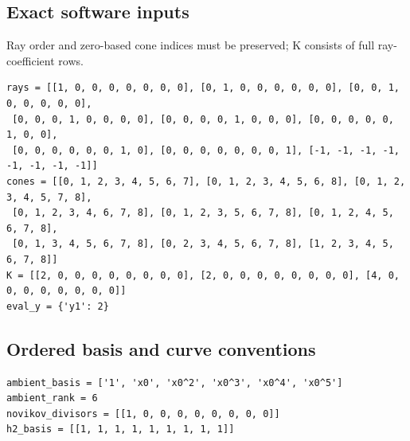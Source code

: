 \documentclass[10pt,a4paper]{article}
\begin{document}
\subsection*{Exact software inputs}
Ray order and zero-based cone indices must be preserved; K consists of full ray-coefficient rows.
\begin{lstlisting}
rays = [[1, 0, 0, 0, 0, 0, 0, 0], [0, 1, 0, 0, 0, 0, 0, 0], [0, 0, 1, 0, 0, 0, 0, 0],
 [0, 0, 0, 1, 0, 0, 0, 0], [0, 0, 0, 0, 1, 0, 0, 0], [0, 0, 0, 0, 0, 1, 0, 0],
 [0, 0, 0, 0, 0, 0, 1, 0], [0, 0, 0, 0, 0, 0, 0, 1], [-1, -1, -1, -1, -1, -1, -1, -1]]
cones = [[0, 1, 2, 3, 4, 5, 6, 7], [0, 1, 2, 3, 4, 5, 6, 8], [0, 1, 2, 3, 4, 5, 7, 8],
 [0, 1, 2, 3, 4, 6, 7, 8], [0, 1, 2, 3, 5, 6, 7, 8], [0, 1, 2, 4, 5, 6, 7, 8],
 [0, 1, 3, 4, 5, 6, 7, 8], [0, 2, 3, 4, 5, 6, 7, 8], [1, 2, 3, 4, 5, 6, 7, 8]]
K = [[2, 0, 0, 0, 0, 0, 0, 0, 0], [2, 0, 0, 0, 0, 0, 0, 0, 0], [4, 0, 0, 0, 0, 0, 0, 0, 0]]
eval_y = {'y1': 2}
\end{lstlisting}
\subsection*{Ordered basis and curve conventions}
\begin{lstlisting}
ambient_basis = ['1', 'x0', 'x0^2', 'x0^3', 'x0^4', 'x0^5']
ambient_rank = 6
novikov_divisors = [[1, 0, 0, 0, 0, 0, 0, 0, 0]]
h2_basis = [[1, 1, 1, 1, 1, 1, 1, 1, 1]]
\end{lstlisting}
\end{document}
